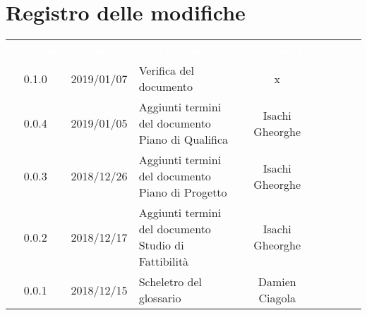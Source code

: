 
\section*{Registro delle modifiche}
{
	\renewcommand{\arraystretch}{1.5}
	\centering
	\begin{longtable}{ c c  C{4cm}  c  c }
		
		\textcolor{white}{\textbf{Versione}} & \textcolor{white}{\textbf{Data}} & \textcolor{white}{\textbf{Descrizione}} & \textcolor{white}{\textbf{Nominativo}} & \textcolor{white}{\textbf{Ruolo}}\\
						
		0.1.0 & 2019/01/07 & Verifica del documento & x & \ver{}\\
				
		0.0.4 & 2019/01/05 & Aggiunti termini del documento Piano di Qualifica & Isachi Gheorghe &\ana{}\\
				
		0.0.3 & 2018/12/26 &Aggiunti termini del documento Piano di Progetto & Isachi Gheorghe & \ana{}\\
				
		0.0.2 & 2018/12/17 & Aggiunti termini del documento Studio di Fattibilità & Isachi Gheorghe &\ana{}\\
		
		0.0.1 & 2018/12/15 & Scheletro del glossario & Damien Ciagola & \ana{}\\
		
	\end{longtable}

}